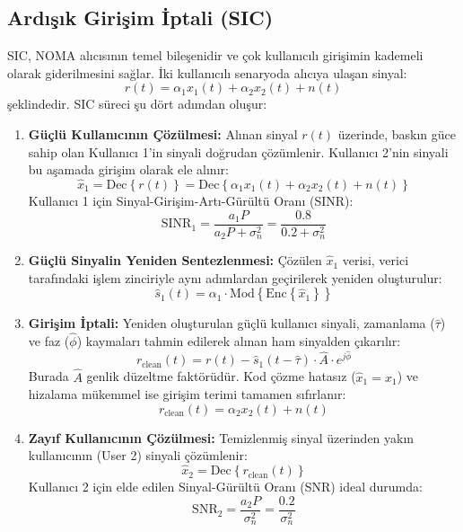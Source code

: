 \subsection{Ardışık Girişim İptali (SIC)}
SIC, NOMA alıcısının temel bileşenidir ve çok kullanıcılı girişimin kademeli olarak giderilmesini sağlar. İki kullanıcılı senaryoda alıcıya ulaşan sinyal:
\begin{equation}
r(t) = \alpha_1 x_1(t) + \alpha_2 x_2(t) + n(t)
\end{equation}
şeklindedir. SIC süreci şu dört adımdan oluşur:
\begin{enumerate}
    \item \textbf{Güçlü Kullanıcının Çözülmesi:} Alınan sinyal $r(t)$ üzerinde, baskın güce sahip olan Kullanıcı 1'in sinyali doğrudan çözümlenir. Kullanıcı 2'nin sinyali bu aşamada girişim olarak ele alınır:
    \begin{equation}
    \hat{x}_1 = \text{Dec}\left\{ r(t) \right\} = \text{Dec}\left\{ \alpha_1 x_1(t) + \alpha_2 x_2(t) + n(t) \right\}
    \end{equation}
    Kullanıcı 1 için Sinyal-Girişim-Artı-Gürültü Oranı (SINR):
    \begin{equation}
    \text{SINR}_1 = \frac{a_1 P}{a_2 P + \sigma_n^2} = \frac{0.8}{0.2 + \sigma_n^2}
    \end{equation}
    \item \textbf{Güçlü Sinyalin Yeniden Sentezlenmesi:} Çözülen $\hat{x}_1$ verisi, verici tarafındaki işlem zinciriyle aynı adımlardan geçirilerek yeniden oluşturulur:
    \begin{equation}
    \hat{s}_1(t) = \alpha_1 \cdot \text{Mod}\left\{ \text{Enc}\left\{ \hat{x}_1 \right\} \right\}
    \end{equation}
    \item \textbf{Girişim İptali:} Yeniden oluşturulan güçlü kullanıcı sinyali, zamanlama ($\hat{\tau}$) ve faz ($\hat{\phi}$) kaymaları tahmin edilerek alınan ham sinyalden çıkarılır:
    \begin{equation}
    r_{\text{clean}}(t) = r(t) - \hat{s}_1(t - \hat{\tau}) \cdot \hat{A} \cdot e^{j\hat{\phi}}
    \end{equation}
    Burada $\hat{A}$ genlik düzeltme faktörüdür. Kod çözme hatasız ($\hat{x}_1 = x_1$) ve hizalama mükemmel ise girişim terimi tamamen sıfırlanır:
    \begin{equation}
    r_{\text{clean}}(t) = \alpha_2 x_2(t) + n(t)
    \end{equation}
    \item \textbf{Zayıf Kullanıcının Çözülmesi:} Temizlenmiş sinyal üzerinden yakın kullanıcının (User 2) sinyali çözümlenir:
    \begin{equation}
    \hat{x}_2 = \text{Dec}\left\{ r_{\text{clean}}(t) \right\}
    \end{equation}
    Kullanıcı 2 için elde edilen Sinyal-Gürültü Oranı (SNR) ideal durumda:
    \begin{equation}
    \text{SNR}_2 = \frac{a_2 P}{\sigma_n^2} = \frac{0.2}{\sigma_n^2}
    \end{equation}
\end{enumerate}

